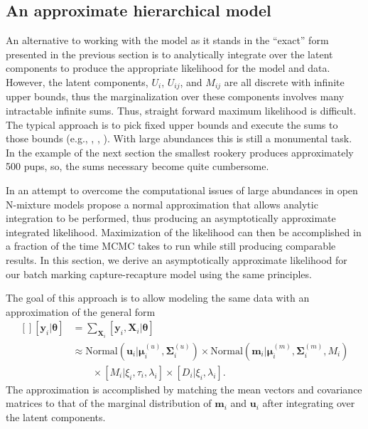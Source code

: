 \documentclass[fleqn,10pt]{wlscirep}
\begin{document}
{\hypertarget{an-approximate-hierarchical-model}{%
\subsection{An approximate hierarchical model}\label{an-approximate-hierarchical-model}}

An alternative to working with the model as it stands in the ``exact'' form presented in the previous section is to analytically integrate over the latent components to produce the appropriate likelihood for the model and data. However, the latent components, \(U_i\), \(U_{ij}\), and \(M_{ij}\) are all discrete with infinite upper bounds, thus the marginalization over these components involves many intractable infinite sums. Thus, straight forward maximum likelihood is difficult. The typical approach is to pick fixed upper bounds and execute the sums to those bounds (e.g., \cite{dail2011models}, \cite{schmidt2015estimating}, \cite{cowen2017hidden}). With large abundances this is still a monumental task. In the example of the next section the smallest rookery produces approximately 500 pups, so, the sums necessary become quite cumbersome.

In an attempt to overcome the computational issues of large abundances in open N-mixture models \cite{brintz2018asymptotic} propose a normal approximation that allows analytic integration to be performed, thus producing an asymptotically approximate integrated likelihood. Maximization of the likelihood can then be accomplished in a fraction of the time MCMC takes to run while still producing comparable results. In this section, we derive an asymptotically approximate likelihood for our batch marking capture-recapture model using the same principles.

The goal of this approach is to allow modeling the same data with an approximation of the general form
\[
\begin{aligned}[]
[\mathbf{y}_i|\boldsymbol{\theta}] &= \sum_{\mathbf{X}_i}[ \mathbf{y}_i,\mathbf{X}_i|\boldsymbol{\theta}] \\
&\approx \text{Normal}(\mathbf{u}_{i}| \boldsymbol{\mu}_{i}^{(u)}, \boldsymbol{\Sigma}_{i}^{(u)}) \times \text{Normal}(\mathbf{m}_{i}| \boldsymbol{\mu}_{i}^{(m)}, \boldsymbol{\Sigma}_{i}^{(m)}, M_i) \\
&\qquad \times [M_i|\xi_i, \tau_i, \lambda_i] \times [D_i|\xi_i, \lambda_i].
\end{aligned}
\]
The approximation is accomplished by matching the mean vectors and covariance matrices to that of the marginal distribution of \(\mathbf{m}_{i}\) and \(\mathbf{u}_{i}\) after integrating over the latent components.

}
\end{document}
